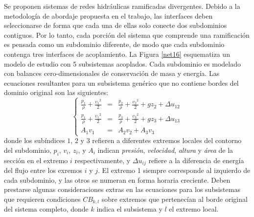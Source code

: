 Se proponen sistemas de redes hidráulicas ramificadas divergentes.
Debido a la metodología de abordaje propuesta en el trabajo, las interfaces deben seleccionarse de forma que cada una de ellas solo conecte dos subdominios contiguos.
Por lo tanto, cada porción del sistema que comprende una ramificación es pensada como un subdominio diferente,
de modo que cada subdominio contenga tres interfaces de acoplamiento.
La Figura \ref{net16} esquematiza un modelo de estudio con 5 subsistemas acoplados.
Cada subdominio es modelado con balances cero-dimensionales de conservación de masa y energía.
Las ecuaciones resultantes para un subsistema genérico que no contiene bordes del dominio original son las siguientes:
\begin{equation}
\left \{
\begin{array}{rcl}
\frac{p_1}{\rho} + \frac{{v_1}^2}{2} &=& \frac{p_2}{\rho} + \frac{{v_2}^2}{2} + gz_2 + \Delta u_{12} \\
\frac{p_1}{\rho} + \frac{{v_1}^2}{2} &=& \frac{p_3}{\rho} + \frac{{v_3}^2}{2} + gz_3 + \Delta u_{13} \\
A_1 v_1 &=& A_2 v_2 + A_3 v_3
\end{array}
\right .
\label{net-eq}
\end{equation}
donde los subíndices $1$, $2$ y $3$ refieren a diferentes extremos locales del contorno del subdominio,
$p_i$, $v_i$, $z_i$, y $A_i$ indican \textit{presión}, \textit{velocidad}, \textit{altura} y \textit{área} de la sección en el extremo $i$ respectivamente,
y $\Delta u_{ij}$ refiere a la diferencia de energía del flujo entre los exremos $i$ y $j$.
El extremo 1 siempre corresponde al izquierdo de cada subdominio, y las otros se numeran en forma horaria creciente.
Deben prestarse algunas consideraciones extras en las ecuaciones para los subsistemas que requieren condiciones $CB_{k,l}$ sobre extremos que pertenecían al borde original del sistema completo,
donde $k$ indica el subsistema y $l$ el extremo local.

